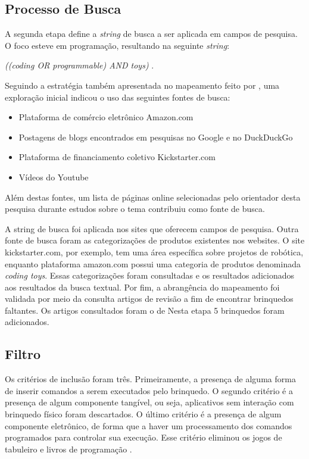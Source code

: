 {\subsection{Processo de Busca}
A segunda etapa define a \textit{string} de busca a ser aplicada em campos de pesquisa. O foco esteve em programação, resultando na seguinte \textit{string}:

\textit{ ((coding OR programmable) AND toys) }.

Seguindo a estratégia também apresentada no mapeamento feito por , uma exploração inicial indicou o uso das seguintes fontes de busca:

\begin{itemize}
    \item Plataforma de comércio eletrônico Amazon.com
    \item Postagens de blogs encontrados em pesquisas no Google e no DuckDuckGo
    \item Plataforma de financiamento coletivo Kickstarter.com
    \item Vídeos do Youtube
\end{itemize}

Além destas fontes, um lista de páginas online selecionadas pelo orientador desta pesquisa durante estudos sobre o tema contribuiu como fonte de busca.

A string de busca foi aplicada nos sites que oferecem campos de pesquisa. Outra fonte de busca foram as categorizações de produtos existentes nos websites. O site kickstarter.com, por exemplo, tem uma área específica sobre projetos de robótica, enquanto plataforma amazon.com possui uma categoria de produtos denominada \textit{coding toys}. Essas categorizações foram consultadas e os resultados adicionados aos resultados da busca textual. Por fim, a abrangência do mapeamento foi validada por meio da consulta artigos de revisão a fim de encontrar brinquedos faltantes. Os artigos consultados foram o de \cite{} Nesta etapa 5 brinquedos foram adicionados.

\subsection{Filtro}
Os critérios de inclusão foram três. Primeiramente, a presença de alguma forma de inserir comandos a serem executados pelo brinquedo. O segundo critério é a presença de algum componente tangível, ou seja, aplicativos sem interação com brinquedo físico foram descartados. O último critério é a presença de algum componente eletrônico, de forma que a haver um processamento dos comandos programados para controlar sua execução. Esse critério eliminou os jogos de tabuleiro e livros de programação \cite{hamilton_emerging_2020}.

}
